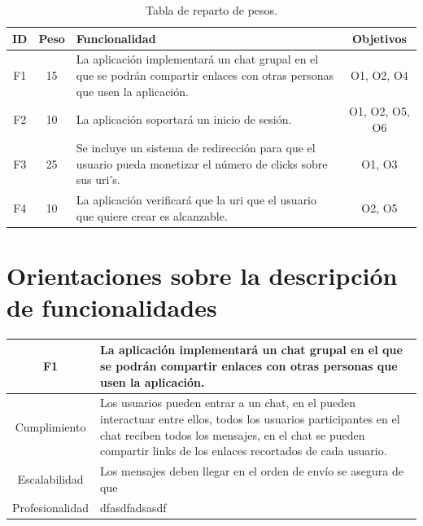 \documentclass{article}
\begin{document}
\begin{table}[hbtp]
    \footnotesize
    \centering
    \settowidth{}
    \setlength\extrarowheight{5pt}
    \begin{tabulary}{\textwidth}{ C C L C}
        \textbf{ID} & 
        \textbf{Peso} & 
        \textbf{Funcionalidad} & 
        \textbf{Objetivos}\\
    \hline
    \hline
        F1 & 
        15 & 
        La aplicación implementará un chat grupal en el que se podrán compartir enlaces con otras personas que usen la aplicación. &
        O1, O2, O4\\
    \hline  
        F2 &
        10 &
        La aplicación soportará un inicio de sesión. &
        O1, O2, O5, O6\\
    \hline
        F3 &
        25 &
        Se incluye un sistema de redirección para que el usuario pueda monetizar el número de clicks sobre sus uri's. &
        O1, O3\\
    \hline
        F4 &
        10 &
        La aplicación verificará que la uri que el usuario que quiere crear es alcanzable. &
        O2, O5

    \end{tabulary}
    \caption{Tabla de reparto de pesos.}
\end{table}

\pagebreak

\section*{Orientaciones sobre la descripción de funcionalidades}


\begin{table}[hbtp]
    \footnotesize
    \centering
    \settowidth{}
    \setlength\extrarowheight{5pt}
    \begin{tabulary}{\textwidth}{ C L }
        \textbf{F1} & La aplicación implementará un chat grupal en el que se podrán compartir enlaces con otras personas que usen la aplicación.
        \\
    \hline
    
    Cumplimiento & Los usuarios pueden entrar a un chat, en el pueden interactuar entre ellos, todos los usuarios participantes en el chat reciben todos los mensajes, en el chat se pueden compartir links de los enlaces recortados de cada usuario.\\
        
    Escalabilidad & Los mensajes deben llegar en el orden de envío se asegura de que  \\

    Profesionalidad & dfasdfadsasdf \\

    \end{tabulary}
\end{table}
\end{document}
